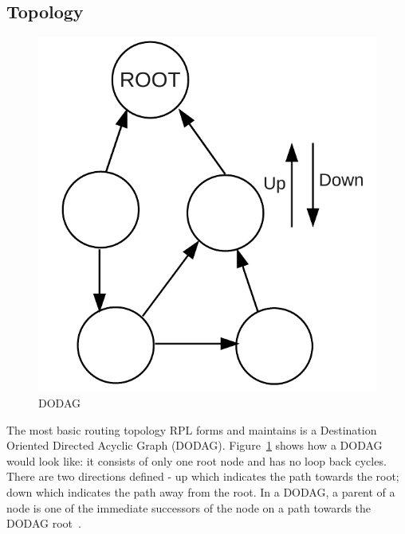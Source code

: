 \subsection{Topology}
\label{RPL:Topology}

\begin{figure}[htbp]
  \begin{center}
    \leavevmode
      \includegraphics[scale=0.4]{Pics/DODAG.pdf}
    \caption{DODAG}
    \label{fig:DODAG}
  \end{center}
\end{figure}
The most basic routing topology RPL forms and maintains is a Destination Oriented Directed Acyclic Graph (DODAG)\@. Figure~\ref{fig:DODAG} shows how a DODAG would look like: it consists of only one root node and has no loop back cycles. There are two directions defined - up which indicates the path towards the root; down which indicates the path away from the root. In a DODAG, a parent of a node is one of the immediate successors of the node on a path towards the DODAG root~\cite{draft-ietf-roll-rpl-19}. 

